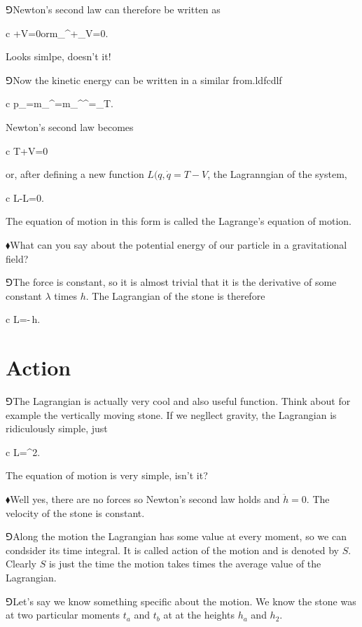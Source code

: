 \documentclass[10pt,oneside%
]{memoir}
\newenvironment{eqna}{\begin{IEEEeqnarray*}{c}}{\end{IEEEeqnarray*}\ignorespacesafterend}
\newcommand{\der}[2]{\frac{\dd#1}{\dd#2}}
\newcommand{\puoli}{\frac{1}{2}}
\newcommand{\orr}{\qquad\textrm{or}\qquad}
\newcommand{\dd}{\mathrm{d}}
\newcommand{\hea}{\(\blacklozenge\)\;}
\newcommand{\heb}{\(\Game\)\;}
\newcommand{\coa}{{\color{black}\bullet}}
\newcommand{\cob}{{\color{oranssi}\bullet}}
\begin{document}
\heb Newton's second law can therefore be written as
\begin{eqna}
    +\partial V=0\orr m_{\coa\cob}^\cob+\partial_\coa V=0.
\end{eqna}
Looks simlpe, doesn't it!

\heb Now the kinetic energy can be written in a similar from.ldfcdlf
\begin{eqna}
    p_\coa=m_{\coa\cob}^\coa=\puoli\dot{\partial}m_{\coa\cob}^\coa{}^\cob=\dot{\partial}_\coa T.
\end{eqna}
Newton's second law becomes
\begin{eqna}
    \der{}{t}\dot{\partial}T+\partial V=0
\end{eqna}
or, after defining a new function \(L(q,\dot{q}=T-V\), the Lagranngian of the system,
\begin{eqna}
    \der{}{t}\dot{\partial}L-\partial L=0.
\end{eqna}
The equation of motion in this form is called the Lagrange's equation of motion.

\hea What can you say about the potential energy of our particle in a gravitational field?

\heb The force is constant, so it is almost trivial that it is the derivative of some constant \(\lambda\) times \(h\). The Lagrangian of the stone is therefore
\begin{eqna}
    L=\puoli{}-\lambda\,h.
\end{eqna}
\section{Action}
\heb The Lagrangian is actually very cool and also useful function. Think about for example the vertically moving stone. If we negllect gravity, the Lagrangian is ridiculously simple, just
\begin{eqna}
    L=\puoli{}^2.
\end{eqna}
The equation of motion is very simple, isn't it?

\hea Well yes, there are no forces so Newton's second law holds and \(\ddot{h}=0\). The velocity of the stone is constant.

\heb Along the motion the Lagrangian has some value at every moment, so we can condsider its time integral. It is called action of the motion and is denoted by \(S\). Clearly \(S\) is just the time the motion takes times the average value of the Lagrangian.

\heb Let's say we know something specific about the motion. We know the stone was at two particular moments \(t_a\) and \(t_b\) at at the heights \(h_a\) and \(h_2\).
\end{document}

